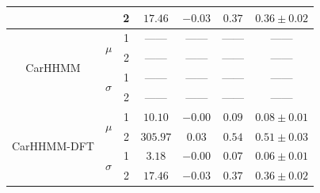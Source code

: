 \begin{table}
{\begin{tabular}{ccccccc}
                           &                               & 2                             & $17.46$                         & $-0.03$                     & $0.37$                             & $0.36 \pm 0.02$                             \\ \hline
\multirow{4}{*}{CarHHMM}   & \multirow{2}{*}{$\mu$}        & 1                             & ------                         & ------                     & ------                             & ------                                      \\
                           &                               & 2                             & ------                         & ------                     & ------                             & ------                                      \\
                           & \multirow{2}{*}{$\sigma$}     & 1                             & ------                         & ------                     & ------                             & ------                                      \\
                           &                               & 2                             & ------                         & ------                     & ------                             & ------                                      \\ \hline
\multirow{4}{*}{CarHHMM-DFT}& \multirow{2}{*}{$\mu$}        & 1                             & $10.10$                         & $-0.00$                     & $0.09$                             & $0.08 \pm 0.01$                             \\
                           &                               & 2                             & $305.97$                         & $0.03$                     & $0.54$                             & $0.51 \pm 0.03$                             \\
                           & \multirow{2}{*}{$\sigma$}     & 1                             & $3.18$                         & $-0.00$                     & $0.07$                             & $0.06 \pm 0.01$                             \\
                           &                               & 2                             & $17.46$                         & $-0.03$                     & $0.37$                             & $0.36 \pm 0.02$                             
\end{tabular}
}
\label{table:FoVeDBA}
\end{table}

